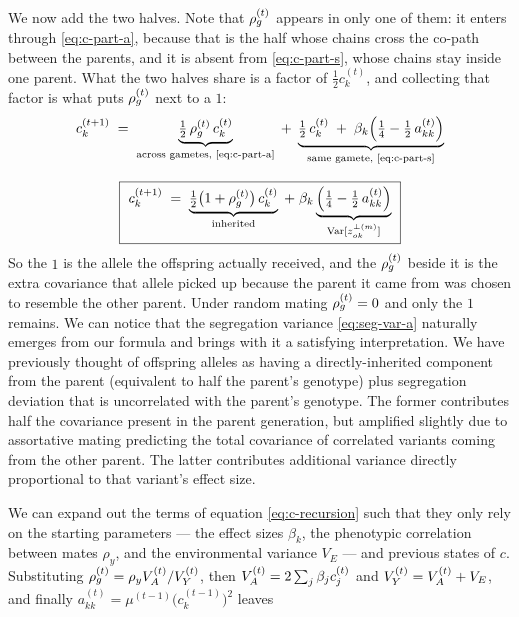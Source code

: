 \documentclass[12pt]{article}
\begin{document}
We now add the two halves.
Note that $\rho_g^{(t)}$ appears in only one of them: it enters through \eqref{eq:c-part-a}, because that is the half whose chains cross the co-path between the parents, and it is absent from \eqref{eq:c-part-s}, whose chains stay inside one parent.
What the two halves share is a factor of $\tfrac12 c^{(t)}_k$, and collecting that factor is what puts $\rho_g^{(t)}$ next to a $1$:
\begin{equation}\label{eq:c-recursion}
\begin{gathered}
    c^{(t+1)}_k \;=\;
    \underbrace{\tfrac12\,\rho_g^{(t)}\, c^{(t)}_k}_{\text{across gametes, \eqref{eq:c-part-a}}}
    \;+\; \underbrace{\tfrac12\, c^{(t)}_k \;+\; \beta_k\Big(\tfrac14 - \tfrac12\,a^{(t)}_{kk}\Big)}_{\text{same gamete, \eqref{eq:c-part-s}}} \\[8pt]
    \boxed{\ c^{(t+1)}_k \;=\; \underbrace{\tfrac12\big(1 + \rho_g^{(t)}\big)\, c^{(t)}_k}_{\text{inherited}}
    \;+\; \beta_k \underbrace{\Big(\tfrac14 - \tfrac12\,a^{(t)}_{kk}\Big)}_{\mathrm{Var}[z^{\perp(m)}_{ok}]} \ }
\end{gathered}
\end{equation}
So the $1$ is the allele the offspring actually received, and the $\rho_g^{(t)}$ beside it is the extra covariance that allele picked up because the parent it came from was chosen to resemble the other parent.
Under random mating $\rho_g^{(t)} = 0$ and only the $1$ remains.
We can notice that the segregation variance \eqref{eq:seg-var-a} naturally emerges from our formula and brings with it a satisfying interpretation.
We have previously thought of offspring alleles as having a directly-inherited component from the parent (equivalent to half the parent's genotype) plus segregation deviation that is uncorrelated with the parent's genotype.
The former contributes half the covariance present in the parent generation, but amplified slightly due to assortative mating predicting the total covariance of correlated variants coming from the other parent.
The latter contributes additional variance directly proportional to that variant's effect size.

We can expand out the terms of equation \eqref{eq:c-recursion} such that they only rely on the starting parameters --- the effect sizes $\beta_k$, the phenotypic correlation between mates $\rho_y$, and the environmental variance $V_E$ --- and previous states of $c$.
Substituting $\rho_g^{(t)} = \rho_yV_A^{(t)}/V_Y^{(t)}$, then $V_A^{(t)} = 2\sum_j \beta_j c^{(t)}_j$ and $V_Y^{(t)} = V_A^{(t)} + V_E$, and finally $a^{(t)}_{kk} = \mu^{(t-1)}\big(c^{(t-1)}_k\big)^2$ leaves
\end{document}
